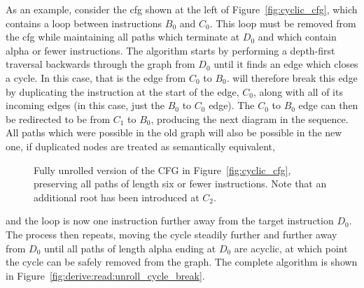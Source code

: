 As an example, consider the \gls{cfg} shown at the left of
Figure~\ref{fig:cyclic_cfg}, which contains a loop between
instructions $B_0$ and $C_0$.  This loop must be removed from the
\gls{cfg} while maintaining all paths which terminate at $D_0$ and
which contain \gls{alpha} or fewer instructions.  The algorithm starts
by performing a depth-first traversal backwards through the graph from
$D_0$ until it finds an edge which closes a cycle.  In this case, that
is the edge from $C_0$ to $B_0$.  {\Technique} will therefore break
this edge by duplicating the instruction at the start of the edge,
$C_0$, along with all of its incoming edges (in this case, just the
$B_0$ to $C_0$ edge).  The $C_0$ to $B_0$ edge can then be redirected
to be from $C_1$ to $B_0$, producing the next diagram in the sequence.
All paths which were possible in the old graph will also be possible
in the new one, if duplicated nodes are treated as semantically
equivalent,
\begin{figure}
\vspace{-3mm}
\caption{Fully unrolled version of the CFG in
  Figure~\ref{fig:cyclic_cfg}, preserving all paths of length six or
  fewer instructions.  Note that an additional root has been
  introduced at $C_2$.}
\label{fig:unrolled_cyclic_cfg}
\vspace{-20pt}
\end{figure}
and the loop is now one instruction further away from the target
instruction $D_0$.  The process then repeats, moving the cycle
steadily further and further away from $D_0$ until all paths of length
\gls{alpha} ending at $D_0$ are acyclic, at which point the cycle can
be safely removed from the graph.  The complete algorithm is shown in
Figure~\ref{fig:derive:read:unroll_cycle_break}.

